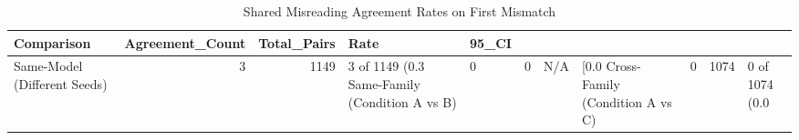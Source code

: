 \begin{table}
\caption{Shared Misreading Agreement Rates on First Mismatch}
\label{tab:wrong_agreement}
\begin{tabular}{lrrll}
\toprule
Comparison & Agreement_Count & Total_Pairs & Rate & 95_CI \\
\midrule
Same-Model (Different Seeds) & 3 & 1149 & 3 of 1149 (0.3%
Same-Family (Condition A vs B) & 0 & 0 & N/A & [0.0%
Cross-Family (Condition A vs C) & 0 & 1074 & 0 of 1074 (0.0%
\bottomrule
\end{tabular}
\end{table}
